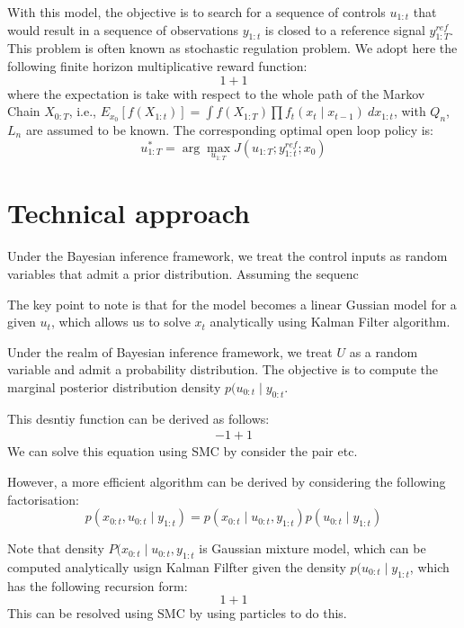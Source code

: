With this model, the objective is to search for a sequence of controls $u_{1:t}$ that would result in a sequence of observations $y_{1:t}$ is closed to a reference signal $y^{ref}_{1:T}$. This problem is often known as stochastic regulation problem. We adopt here the following finite horizon multiplicative reward function:
\begin{equation}
1+1
\end{equation}
where the expectation is take with respect to the whole path of the Markov Chain $X_{0:T}$, i.e., $E_{x_0}[f(X_{1:t})] = \int f(X_{1:T}) \prod f_t(x_t \mid x_{t-1})~dx_{1:t}$, with $Q_n$, $L_n$ are assumed to be known. The corresponding optimal open loop policy is:
\begin{equation}
  u^*_{1:T} = \arg\max_{u_{1:T}} J(u_{1:T};y^{ref}_{1:t};x_0)
\end{equation}

\section{Technical approach}
Under the Bayesian inference framework, we treat the control inputs as random variables that admit a prior distribution. Assuming the sequenc

The key point to note is that for the model becomes a linear Gussian model for a given $u_t$, which allows us to solve $x_t$ analytically using Kalman Filter algorithm.

Under the realm of Bayesian inference framework, we treat $U$ as a random variable and admit a probability distribution. The objective is to compute the marginal posterior distribution density $p(u_{0:t} \mid y_{0:t}$.

This desntiy function can be derived as follows:
\begin{align}
  -1+1
\end{align}
We can solve this equation using SMC by consider the pair etc.

However, a more efficient algorithm can be derived by considering the following factorisation:
\begin{equation}
  p(x_{0:t}, u_{0:t} \mid y_{1:t}) = p(x_{0:t} \mid u_{0:t}, y_{1:t}) p(u_{0:t} \mid y_{1:t})
\end{equation}

Note that density $P(x_{0:t} \mid u_{0:t}, y_{1:t}$ is Gaussian mixture model, which can be computed analytically usign Kalman Filfter given the density $p(u_{0:t} \mid y_{1:t}$, which has the following recursion form:
\begin{equation}
 1+1
\end{equation}
This can be resolved using SMC by using particles to do this.


